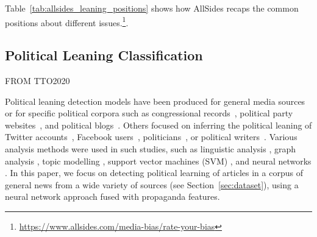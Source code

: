 Table~\ref{tab:allsides_leaning_positions} shows how AllSides recaps the common positions about different issues.\footnote{\url{https://www.allsides.com/media-bias/rate-your-bias}}.




\subsection{Political Leaning Classification}
\label{ssec:lit_leaning_classification}

FROM TTO2020



Political leaning detection models have been produced for general media sources~\cite{budak} or for 
specific political corpora such as congressional records~\cite{gentzkow}, political party websites~\cite{yan2017perils}, and political blogs~\cite{ahmed201}.  
Others focused on inferring the political leaning of Twitter accounts~\cite{Cohen2013ClassifyingPO}, Facebook users~\cite{Bakshy1130}, politicians~\cite{thomas-etal-2006-get}, or political writers~\cite{iyyer-etal-2014-political}. 
Various analysis methods were used in such studies, such as linguistic analysis \cite{gentzkow}, graph analysis \cite{chen2017opinion}, topic modelling \cite{ahmed201, Cohen2013ClassifyingPO}, support vector machines (SVM) \cite{Bakshy1130,thomas-etal-2006-get}, and neural networks \cite{iyyer-etal-2014-political,baly2020we}. In this paper, we focus on detecting political learning of articles in a corpus of general news from a wide variety of sources (see Section~\ref{sec:dataset}), using a neural network approach fused with propaganda features. %



